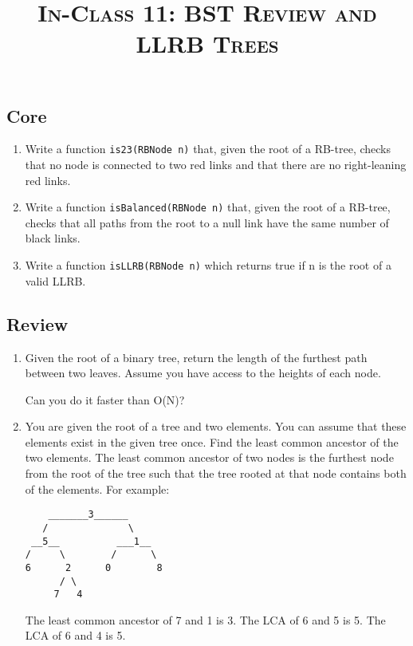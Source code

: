 \documentclass{article}
\title{\large{\textsc{In-Class 11: BST Review and LLRB Trees}}}
\date{}
\begin{document}
\maketitle

\subsection*{Core}


\begin{enumerate}

\begin{lstlisting}[language=Java]
public class RBNode<T> {
    T key;
    RBNode<T> leftChild, rightChild;
    boolean isRed;
}
\end{lstlisting}


\item  Write a function \texttt{is23(RBNode n)} that, given the root of a RB-tree, checks that no node is connected to two red links and that there are no right-leaning red links.

\item  Write a function \texttt{isBalanced(RBNode n)} that, given the root of a RB-tree, checks that all paths from the root to a null link have the same number of black links.

\item Write a function \texttt{isLLRB(RBNode n)} which returns true if n is the root of a valid LLRB.
\end{enumerate}
\subsection*{Review}
\begin{enumerate}


\item Given the root of a binary tree, return the length of the furthest path between two leaves. Assume you have access to the heights of each node. 

Can you do it faster than O(N)?


\item You are given the root of a tree and two elements. You can assume that these elements exist in the given tree once. Find the least common ancestor of the two elements. The least common ancestor of two nodes is the furthest node from the root of the tree such that the tree rooted at that node contains both of the elements. For example:

\begin{lstlisting}
    _______3______
   /              \
 __5__          ___1__
/     \        /      \
6      2      0        8
      / \
     7   4
\end{lstlisting}

The least common ancestor of 7 and 1 is 3. The LCA of 6 and 5 is 5. The LCA of 6 and 4 is 5.


\end{enumerate}
\end{document}
